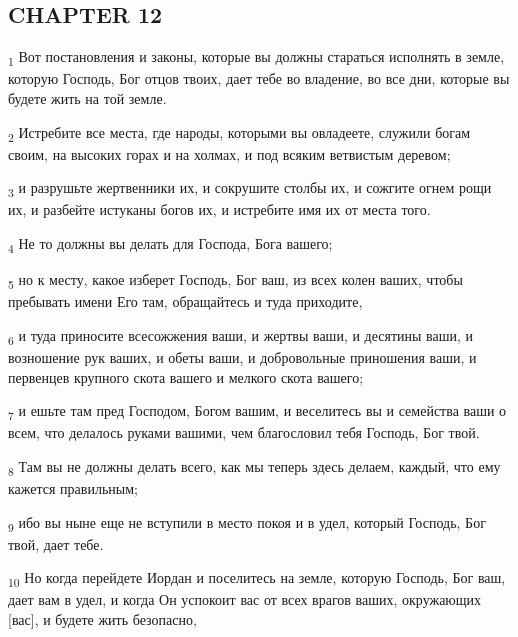 \subsection{CHAPTER 12}
\begin{tcolorbox}
\textsubscript{1} Вот постановления и законы, которые вы должны стараться исполнять в земле, которую Господь, Бог отцов твоих, дает тебе во владение, во все дни, которые вы будете жить на той земле.
\end{tcolorbox}
\begin{tcolorbox}
\textsubscript{2} Истребите все места, где народы, которыми вы овладеете, служили богам своим, на высоких горах и на холмах, и под всяким ветвистым деревом;
\end{tcolorbox}
\begin{tcolorbox}
\textsubscript{3} и разрушьте жертвенники их, и сокрушите столбы их, и сожгите огнем рощи их, и разбейте истуканы богов их, и истребите имя их от места того.
\end{tcolorbox}
\begin{tcolorbox}
\textsubscript{4} Не то должны вы делать для Господа, Бога вашего;
\end{tcolorbox}
\begin{tcolorbox}
\textsubscript{5} но к месту, какое изберет Господь, Бог ваш, из всех колен ваших, чтобы пребывать имени Его там, обращайтесь и туда приходите,
\end{tcolorbox}
\begin{tcolorbox}
\textsubscript{6} и туда приносите всесожжения ваши, и жертвы ваши, и десятины ваши, и возношение рук ваших, и обеты ваши, и добровольные приношения ваши, и первенцев крупного скота вашего и мелкого скота вашего;
\end{tcolorbox}
\begin{tcolorbox}
\textsubscript{7} и ешьте там пред Господом, Богом вашим, и веселитесь вы и семейства ваши о всем, что делалось руками вашими, чем благословил тебя Господь, Бог твой.
\end{tcolorbox}
\begin{tcolorbox}
\textsubscript{8} Там вы не должны делать всего, как мы теперь здесь делаем, каждый, что ему кажется правильным;
\end{tcolorbox}
\begin{tcolorbox}
\textsubscript{9} ибо вы ныне еще не вступили в место покоя и в удел, который Господь, Бог твой, дает тебе.
\end{tcolorbox}
\begin{tcolorbox}
\textsubscript{10} Но когда перейдете Иордан и поселитесь на земле, которую Господь, Бог ваш, дает вам в удел, и когда Он успокоит вас от всех врагов ваших, окружающих [вас], и будете жить безопасно,
\end{tcolorbox}
